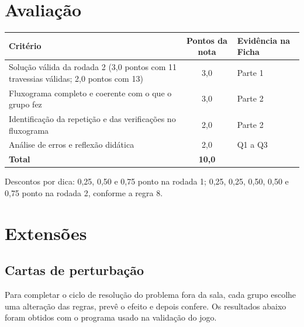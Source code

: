 \documentclass[12pt,a4paper]{article}
\begin{document}
\section{Avaliação}

\begin{center}
\renewcommand{\arraystretch}{1.3}
\begin{tabular}{@{}>{\raggedright\arraybackslash}p{8.2cm}c>{\raggedright\arraybackslash}p{4.6cm}@{}}
\toprule
\textbf{Critério} & \textbf{Pontos da nota} & \textbf{Evidência na Ficha} \\
\midrule
Solução válida da rodada 2 (3,0 pontos com 11 travessias válidas; 2,0 pontos com 13) & 3,0 & Parte 1 \\
Fluxograma completo e coerente com o que o grupo fez & 3,0 & Parte 2 \\
Identificação da repetição e das verificações no fluxograma & 2,0 & Parte 2 \\
Análise de erros e reflexão didática & 2,0 & Q1 a Q3 \\
\midrule
\textbf{Total} & \textbf{10,0} & \\
\bottomrule
\end{tabular}
\end{center}

Descontos por dica: 0,25, 0,50 e 0,75 ponto na rodada 1; 0,25, 0,25, 0,50, 0,50 e 0,75 ponto na rodada 2, conforme a regra 8.

\section{Extensões}

\subsection{Cartas de perturbação}

Para completar o ciclo de resolução do problema fora da sala, cada grupo escolhe uma
alteração das regras, prevê o efeito e depois confere. Os resultados abaixo
foram obtidos com o programa usado na validação do jogo.
\end{document}
